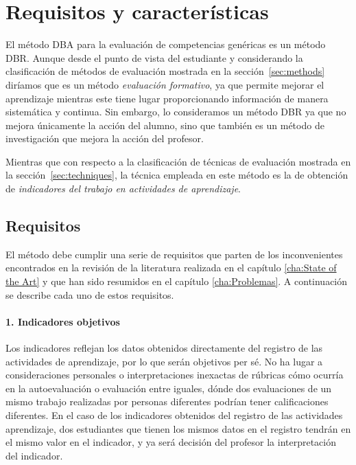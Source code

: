 \section{Requisitos y características}

El método DBA para la evaluación de competencias genéricas es un método DBR. Aunque desde el punto de vista del estudiante y considerando la clasificación de métodos de evaluación mostrada en la sección~\ref{sec:methods} diríamos que es un método \emph{evaluación formativo}, ya que permite mejorar el aprendizaje mientras este tiene lugar proporcionando información de manera sistemática y continua. Sin embargo, lo consideramos un método DBR ya que no mejora únicamente la acción del alumno, sino que también es un método de investigación que mejora la acción del profesor.

Mientras que con respecto a la clasificación de técnicas de evaluación mostrada en la sección~\ref{sec:techniques}, la técnica empleada en este método es la de obtención de \emph{indicadores del trabajo en actividades de aprendizaje}.

\subsection{Requisitos}

El método debe cumplir una serie de requisitos que parten de los inconvenientes encontrados en la revisión de la literatura realizada en el capítulo \ref{cha:State of the Art} y que han sido resumidos en el capítulo \ref{cha:Problemas}. A continuación se describe cada uno de estos requisitos.

\paragraph*{1. Indicadores objetivos}

Los indicadores reflejan los datos obtenidos directamente del registro de las actividades de aprendizaje, por lo que serán objetivos per sé. No ha lugar a consideraciones personales o interpretaciones inexactas de rúbricas cómo ocurría en la autoevaluación o evaluación entre iguales, dónde dos evaluaciones de un mismo trabajo realizadas por personas diferentes podrían tener calificaciones diferentes. En el caso de los indicadores obtenidos del registro de las actividades aprendizaje, dos estudiantes que tienen los mismos datos en el registro tendrán en el mismo valor en el indicador, y ya será decisión del profesor la interpretación del indicador.

